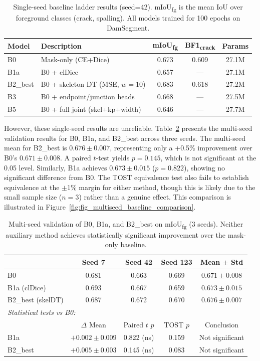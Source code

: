 \documentclass[preprint,12pt]{elsarticle}
\begin{document}
\begin{table}[t]
\centering
\caption{Single-seed baseline ladder results (seed=42). mIoU\textsubscript{fg} is the mean IoU over foreground classes (crack, spalling). All models trained for 100 epochs on DamSegment.}
\label{tab:single_seed_ladder}
\begin{tabular}{llccc}
\toprule
Model & Description & mIoU\textsubscript{fg} & BF1\textsubscript{crack} & Params \\
\midrule
B0 & Mask-only (CE+Dice) & 0.673 & 0.609 & 27.1M \\
B1a & B0 + clDice & 0.657 & --- & 27.1M \\
B2\_best & B0 + skeleton DT (MSE, $w{=}10$) & 0.683 & 0.618 & 27.2M \\
B3 & B0 + endpoint/junction heads & 0.668 & --- & 27.5M \\
B5 & B0 + full joint (skel+kp+width) & 0.646 & --- & 27.7M \\
\bottomrule
\end{tabular}
\end{table}

However, these single-seed results are unreliable. Table~\ref{tab:multiseed_validation} presents the multi-seed validation results for B0, B1a, and B2\_best across three seeds. The multi-seed mean for B2\_best is $0.676 \pm 0.007$, representing only a +0.5\% improvement over B0's $0.671 \pm 0.008$. A paired $t$-test yields $p = 0.145$, which is not significant at the 0.05 level. Similarly, B1a achieves $0.673 \pm 0.015$ ($p = 0.822$), showing no significant difference from B0. The TOST equivalence test also fails to establish equivalence at the $\pm$1\% margin for either method, though this is likely due to the small sample size ($n = 3$) rather than a genuine effect. This comparison is illustrated in Figure~\ref{fig:fig_multiseed_baseline_comparison}.

\begin{table}[t]
\centering
\caption{Multi-seed validation of B0, B1a, and B2\_best on mIoU\textsubscript{fg} (3 seeds). Neither auxiliary method achieves statistically significant improvement over the mask-only baseline.}
\label{tab:multiseed_validation}
\begin{tabular}{lcccc}
\toprule
 & Seed 7 & Seed 42 & Seed 123 & Mean $\pm$ Std \\
\midrule
B0 & 0.681 & 0.663 & 0.669 & $0.671 \pm 0.008$ \\
B1a (clDice) & 0.693 & 0.667 & 0.659 & $0.673 \pm 0.015$ \\
B2\_best (skelDT) & 0.687 & 0.672 & 0.670 & $0.676 \pm 0.007$ \\
\midrule
\multicolumn{5}{l}{\textit{Statistical tests vs B0:}} \\
\midrule
 & $\Delta$ Mean & Paired $t$ $p$ & TOST $p$ & Conclusion \\
\midrule
B1a & $+0.002 \pm 0.009$ & 0.822 (ns) & 0.159 & Not significant \\
B2\_best & $+0.005 \pm 0.003$ & 0.145 (ns) & 0.083 & Not significant \\
\bottomrule
\end{tabular}
\end{table}
\end{document}
